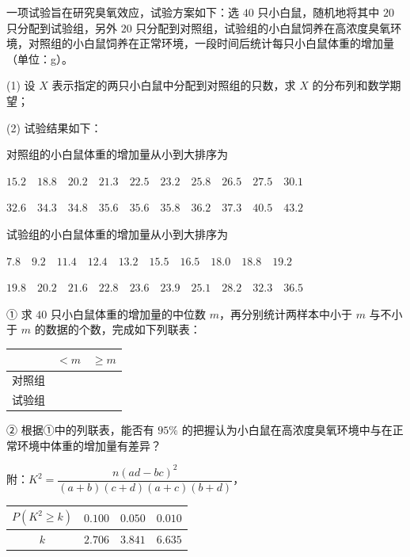 \begin{question}
一项试验旨在研究臭氧效应，试验方案如下：选 $40$ 只小白鼠，随机地将其中 $20$ 只分配到试验组，另外 $20$ 只分配到对照组，试验组的小白鼠饲养在高浓度臭氧环境，对照组的小白鼠饲养在正常环境，一段时间后统计每只小白鼠体重的增加量（单位：g）。

  (1) 设 $X$ 表示指定的两只小白鼠中分配到对照组的只数，求 $X$ 的分布列和数学期望；

  (2) 试验结果如下：

对照组的小白鼠体重的增加量从小到大排序为

$15.2\quad18.8\quad20.2\quad21.3\quad22.5\quad23.2\quad25.8\quad26.5\quad27.5\quad30.1$

$32.6\quad34.3\quad34.8\quad35.6\quad35.6\quad35.8\quad36.2\quad37.3\quad40.5\quad43.2$

试验组的小白鼠体重的增加量从小到大排序为

$7.8\quad9.2\quad11.4\quad12.4\quad13.2\quad15.5\quad16.5\quad18.0\quad18.8\quad19.2$

$19.8\quad20.2\quad21.6\quad22.8\quad23.6\quad23.9\quad25.1\quad28.2\quad32.3\quad36.5$

① 求 $40$ 只小白鼠体重的增加量的中位数 $m$，再分别统计两样本中小于 $m$ 与不小于 $m$ 的数据的个数，完成如下列联表：

\begin{center}
\begin{tabular}{ccc}
\toprule
 & $<m$ & $\geqslant m$ \\
\midrule
对照组 &  &  \\
试验组 &  &  \\
\bottomrule
\end{tabular}
\end{center}

② 根据①中的列联表，能否有 $95\%$ 的把握认为小白鼠在高浓度臭氧环境中与在正常环境中体重的增加量有差异？

附：$K^2=\dfrac{n(ad-bc)^2}{(a+b)(c+d)(a+c)(b+d)}$，

\begin{center}
\begin{tabular}{cccc}
\toprule
$P(K^2\geqslant k)$ & $0.100$ & $0.050$ & $0.010$ \\
\midrule
$k$ & $2.706$ & $3.841$ & $6.635$ \\
\bottomrule
\end{tabular}
\end{center}

\end{question}
